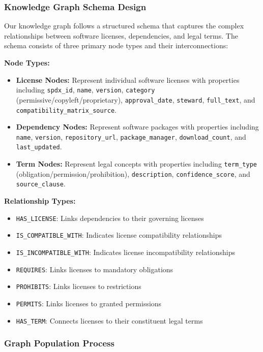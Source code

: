 \subsubsection{Knowledge Graph Schema Design}

Our knowledge graph follows a structured schema that captures the complex relationships between software licenses, dependencies, and legal terms. The schema consists of three primary node types and their interconnections:

\textbf{Node Types:}
\begin{itemize}
    \item \textbf{License Nodes:} Represent individual software licenses with properties including \texttt{spdx\_id}, \texttt{name}, \texttt{version}, \texttt{category} (permissive/copyleft/proprietary), \texttt{approval\_date}, \texttt{steward}, \texttt{full\_text}, and \texttt{compatibility\_matrix\_source}.
    \item \textbf{Dependency Nodes:} Represent software packages with properties including \texttt{name}, \texttt{version}, \texttt{repository\_url}, \texttt{package\_manager}, \texttt{download\_count}, and \texttt{last\_updated}.
    \item \textbf{Term Nodes:} Represent legal concepts with properties including \texttt{term\_type} (obligation/permission/prohibition), \texttt{description}, \texttt{confidence\_score}, and \texttt{source\_clause}.
\end{itemize}

\textbf{Relationship Types:}
\begin{itemize}
    \item \texttt{HAS\_LICENSE}: Links dependencies to their governing licenses
    \item \texttt{IS\_COMPATIBLE\_WITH}: Indicates license compatibility relationships
    \item \texttt{IS\_INCOMPATIBLE\_WITH}: Indicates license incompatibility relationships
    \item \texttt{REQUIRES}: Links licenses to mandatory obligations
    \item \texttt{PROHIBITS}: Links licenses to restrictions
    \item \texttt{PERMITS}: Links licenses to granted permissions
    \item \texttt{HAS\_TERM}: Connects licenses to their constituent legal terms
\end{itemize}

\subsubsection{Graph Population Process}

